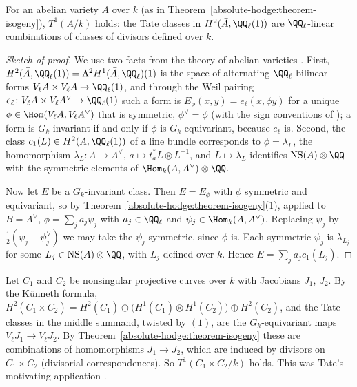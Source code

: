 \begin{corollary}\label{absolute-hodge:corollary-divisors-abelian}
For an abelian variety $A$ over $k$ (as in Theorem~\ref{absolute-hodge:theorem-isogeny}), $T^1(A/k)$ holds: the Tate classes in $H^2(\bar A, \QQ_\ell(1))$ are $\QQ_\ell$-linear combinations of classes of divisors
defined over $k$.
\end{corollary}

\begin{proof}[Sketch of proof]
We use two facts from the theory of abelian varieties \cite{mumford-abelian}. First, $H^2(\bar A, \QQ_\ell(1)) = \Lambda^2H^1(\bar A, \QQ_\ell)(1)$ is the space of alternating $\QQ_\ell$-bilinear forms
$V_\ell A \times V_\ell A \to \QQ_\ell(1)$, and through the Weil pairing $e_\ell \colon V_\ell A \times V_\ell A^\vee \to \QQ_\ell(1)$ such a form is $E_\phi(x, y) = e_\ell(x, \phi y)$ for a unique
$\phi \in \Hom(V_\ell A, V_\ell A^\vee)$ that is symmetric, $\phi^\vee = \phi$ (with the sign conventions of \cite{mumford-abelian}); a form is $G_k$-invariant if and only if $\phi$ is $G_k$-equivariant, because
$e_\ell$ is. Second, the class $c_1(L) \in H^2(\bar A, \QQ_\ell(1))$ of a line bundle corresponds to $\phi = \lambda_L$, the homomorphism $\lambda_L \colon A \to A^\vee$, $a \mapsto t_a^*L \otimes L^{-1}$, and
$L \mapsto \lambda_L$ identifies $\mathrm{NS}(A) \otimes \QQ$ with the symmetric elements of $\Hom_k(A, A^\vee) \otimes \QQ$.

Now let $E$ be a $G_k$-invariant class. Then $E = E_\phi$ with $\phi$ symmetric and equivariant, so by Theorem~\ref{absolute-hodge:theorem-isogeny}(1), applied to $B = A^\vee$,
$\phi = \sum_ja_j\psi_j$ with $a_j \in \QQ_\ell$ and $\psi_j \in \Hom_k(A, A^\vee)$. Replacing $\psi_j$ by $\frac12(\psi_j + \psi_j^\vee)$ we may take the $\psi_j$ symmetric, since $\phi$ is. Each symmetric $\psi_j$ is
$\lambda_{L_j}$ for some $L_j \in \mathrm{NS}(A) \otimes \QQ$, with $L_j$ defined over $k$. Hence $E = \sum_ja_jc_1(L_j)$.
\end{proof}

\begin{example}\label{absolute-hodge:example-products-curves}
Let $C_1$ and $C_2$ be nonsingular projective curves over $k$ with Jacobians $J_1$, $J_2$. By the K\"unneth formula,
$H^2(\bar C_1 \times \bar C_2) = H^2(\bar C_1) \oplus \big(H^1(\bar C_1) \otimes H^1(\bar C_2)\big) \oplus H^2(\bar C_2)$, and the Tate classes in the middle summand, twisted by $(1)$, are the $G_k$-equivariant maps
$V_\ell J_1 \to V_\ell J_2$. By Theorem~\ref{absolute-hodge:theorem-isogeny} these are combinations of homomorphisms $J_1 \to J_2$, which are induced by divisors on $C_1 \times C_2$ (divisorial
correspondences). So $T^1(C_1 \times C_2/k)$ holds. This was Tate's motivating application \cite{tate-1966}.
\end{example}

